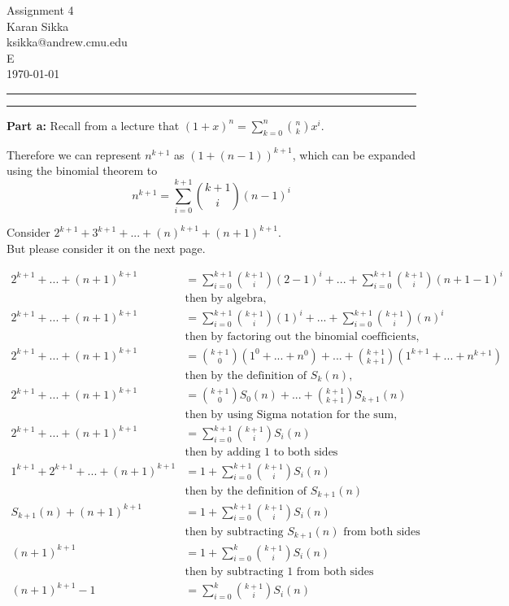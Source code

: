 \documentclass[11pt]{article}
\makeatletter
\newcounter{questionCounter}
\newcounter{partCounter}[questionCounter]
\newenvironment{question}[2][\arabic{questionCounter}]{%
    \setcounter{partCounter}{0}%
    \vspace{.25in} \hrule \vspace{0.5em}%
        \noindent{\bf #2}%
    \vspace{0.8em} \hrule \vspace{.10in}%
    \addtocounter{questionCounter}{1}%
}{}
\newcommand{\myname}{Karan Sikka}
\newcommand{\myandrew}{ksikka@andrew.cmu.edu}
\newcommand{\myhwname}{Assignment 4}
\newcommand{\myrecitation}{E}
\makeatother
\begin{document}
\thispagestyle{plain}

\begin{center}
{\Large \myhwname} \\
\myname \\
\myandrew \\
\myrecitation \\
\today
\end{center}

\begin{question}{Apocalypse Averted}
\textbf{Part a:} Recall from a lecture that $ (1 + x)^{n} = \sum_{k=0}^{n}{\binom{n}{k}x^i}$.

Therefore we can represent $n^{k+1}$ as $(1 + (n-1))^{k+1}$, which can be expanded 
using the binomial theorem to $$n^{k+1}=\sum_{i=0}^{k+1}{\binom{k+1}{i}(n-1)^i}$$

Consider $2^{k+1} + 3^{k+1} + ... + (n)^{k+1} + (n+1)^{k+1}$.\\
But please consider it on the next page.

\begin{align*}
2^{k+1} + ... + (n+1)^{k+1} &= \sum_{i=0}^{k+1}{\binom{k+1}{i}(2-1)^{i}} + ... + \sum_{i=0}^{k+1}{\binom{k+1}{i}(n+1-1)^{i}}\\
&\mbox{then by algebra,}\\
2^{k+1} + ... + (n+1)^{k+1} &= \sum_{i=0}^{k+1}{\binom{k+1}{i}(1)^{i}} + ... + \sum_{i=0}^{k+1}{\binom{k+1}{i}(n)^{i}}\\
&\mbox{then by factoring out the binomial coefficients,}\\
2^{k+1} + ... + (n+1)^{k+1} &= \binom{k+1}{0}(1^0 + ... + n^0) + ... + \binom{k+1}{k+1}(1^{k+1} + ... + n^{k+1})\\
&\mbox{then by the definition of $S_k(n)$,}\\
2^{k+1} + ... + (n+1)^{k+1} &= \binom{k+1}{0}S_0(n) + ... + \binom{k+1}{k+1}S_{k+1}(n)\\
&\mbox{then by using Sigma notation for the sum,}\\
2^{k+1} + ... + (n+1)^{k+1} &= \sum_{i=0}^{k+1}\binom{k+1}{i}S_i(n)\\
&\mbox{then by adding 1 to both sides}\\
1^{k+1} + 2^{k+1} + ... + (n+1)^{k+1} &= 1 + \sum_{i=0}^{k+1}\binom{k+1}{i}S_i(n)\\
&\mbox{then by the definition of $S_{k+1}(n)$ }\\
S_{k+1}(n) + (n+1)^{k+1} &= 1 + \sum_{i=0}^{k+1}\binom{k+1}{i}S_i(n)\\
&\mbox{then by subtracting $S_{k+1}(n)$ from both sides }\\
(n+1)^{k+1} &= 1 + \sum_{i=0}^{k}\binom{k+1}{i}S_i(n)\\
&\mbox{then by subtracting $1$ from both sides }\\
(n+1)^{k+1} - 1 &= \sum_{i=0}^{k}\binom{k+1}{i}S_i(n)\\
\end{align*}


\end{question}
\end{document}
